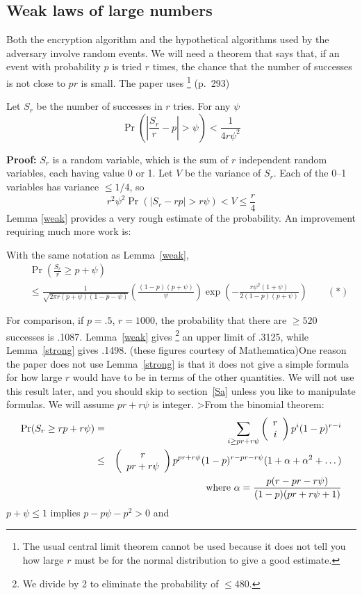 \subsection{Weak laws of large numbers}
Both the encryption algorithm and the hypothetical algorithms used by
the adversary involve random events.  We will need a theorem that says
that, if an event with probability $p$ is tried $r$ times, the chance that
the number of successes is not close to $pr$ is small.  The paper uses%
\footnote{The usual central limit theorem cannot be used because it does
not tell you how large $r$ must be for the normal distribution to give
a good estimate.}
(p.~293) \begin{Le}Let $S_r$ be the number of successes in $r$ tries.
For any $\psi$ $$\Pr\left(\left|\frac{S_r}r-p\right|
>\psi\right)<\frac1{4r\psi^2}$$
\label{weak}\end{Le}
\par{\bf Proof:} $S_r$ is a random variable, which is the sum of $r$
independent random variables, each having value 0 or 1.  Let $V$ be the
variance of $S_r$.  Each of the 0--1 variables has variance $\le1/4$,
so $$r^2\psi^2\Pr(|S_r-rp|>r\psi)<V\le\frac r4$$
\pq Lemma \ref{weak} provides a very rough estimate of the probability.
An improvement requiring much more work is:
\begin{Le} \label{strong}With the same notation as Lemma~\ref{weak}, 
\begin{eqnarray*}&&\Pr\left(\frac{S_r}r\ge p+\psi\right)\\&&
\le\frac1{\sqrt{2\pi r(p+\psi)(1-p-\psi)}}
\left(\frac{(1-p)(p+\psi)}\psi\right)\exp\left(
-\frac{r\psi^2(1+\psi)}{2(1-p)(p+\psi)}\right)
\qquad(*)\end{eqnarray*}\end{Le}
\par For comparison, if $p=.5$, $r=1000$, the probability that there are
$\ge520$ successes is .1087.  Lemma~\ref{weak} gives%
\footnote{We divide by 2 to eliminate the probability of $\le480$.}
an upper limit of .3125,
while Lemma~\ref{strong} gives .1498.  (these figures courtesy of 
Mathematica)\pq One reason the paper does not
use Lemma~\ref{strong} is that it does not give a simple formula for
how large $r$ would have to be in terms of the other quantities. We will
not use this result later, and you should skip to section~\ref{Sa}
unless you like to manipulate formulas.
 We will assume $pr+r\psi$ is integer.
>From the binomial theorem:
\begin{eqnarray*}
\Pr(S_r\ge rp+r\psi)&=&\sum_{i\ge pr+r\psi}
\left(\begin{array}{c}r\\i\end{array}
\right)p^i(1-p)^{r-i}\\&\le&\left(\begin{array}{c}r\\pr+r\psi\end{array}
\right)p^{pr+r\psi}(1-p)^{r-pr-r\psi}(1+\alpha+\alpha^2+\dots)\\
&&\hbox{where }\alpha=\frac{p(r-pr-r\psi)}{(1-p)(pr+r\psi+1)}
\end{eqnarray*}$p+\psi\le1$ implies $p-p\psi-p^2>0$ and
